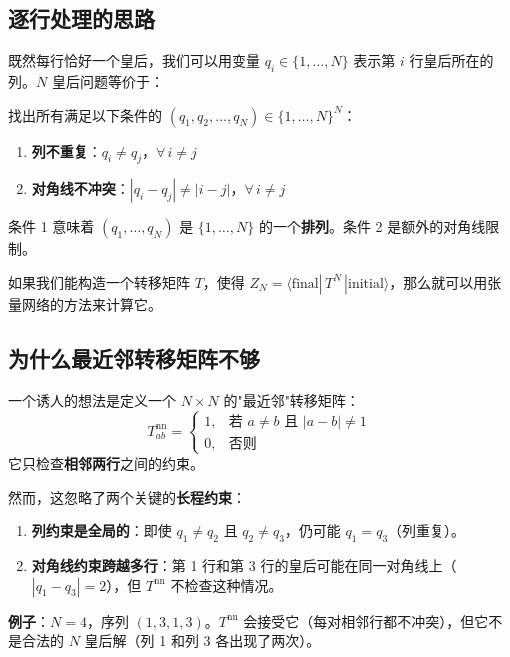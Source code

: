 \documentclass[12pt,a4paper]{ctexart}
\begin{document}
\subsection{逐行处理的思路}

既然每行恰好一个皇后，我们可以用变量 $q_i \in \{1, \ldots, N\}$ 表示第 $i$ 行皇后所在的列。$N$ 皇后问题等价于：

\begin{tcolorbox}[colback=blue!5, colframe=blue!50!black]
找出所有满足以下条件的 $(q_1, q_2, \ldots, q_N) \in \{1, \ldots, N\}^N$：
\begin{enumerate}
    \item \textbf{列不重复}：$q_i \neq q_j$，$\forall\, i \neq j$
    \item \textbf{对角线不冲突}：$|q_i - q_j| \neq |i - j|$，$\forall\, i \neq j$
\end{enumerate}
\end{tcolorbox}

条件 1 意味着 $(q_1, \ldots, q_N)$ 是 $\{1, \ldots, N\}$ 的一个\textbf{排列}。条件 2 是额外的对角线限制。

如果我们能构造一个转移矩阵 $T$，使得 $Z_N = \langle \text{final}| \, T^N \, |\text{initial}\rangle$，那么就可以用张量网络的方法来计算它。

\subsection{为什么最近邻转移矩阵不够}

一个诱人的想法是定义一个 $N \times N$ 的"最近邻"转移矩阵：
\begin{equation}
T^{\text{nn}}_{ab} = \begin{cases} 1, & \text{若 } a \neq b \text{ 且 } |a - b| \neq 1 \\ 0, & \text{否则} \end{cases}
\end{equation}
它只检查\textbf{相邻两行}之间的约束。

然而，这忽略了两个关键的\textbf{长程约束}：
\begin{enumerate}
    \item \textbf{列约束是全局的}：即使 $q_1 \neq q_2$ 且 $q_2 \neq q_3$，仍可能 $q_1 = q_3$（列重复）。
    \item \textbf{对角线约束跨越多行}：第 1 行和第 3 行的皇后可能在同一对角线上（$|q_1 - q_3| = 2$），但 $T^{\text{nn}}$ 不检查这种情况。
\end{enumerate}

\textbf{例子}：$N = 4$，序列 $(1, 3, 1, 3)$。$T^{\text{nn}}$ 会接受它（每对相邻行都不冲突），但它不是合法的 $N$ 皇后解（列 1 和列 3 各出现了两次）。
\end{document}
